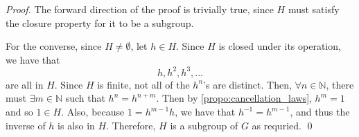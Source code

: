 \begin{proof}
  The forward direction of the proof is trivially true, since $H$ must satisfy the closure property for it to be a subgroup.

  For the converse, since $H \neq \emptyset$, let $h \in H$. Since $H$ is closed under its operation, we have that
  \begin{equation*}
    h, h^2, h^3, ...
  \end{equation*}
  are all in $H$. Since $H$ is finite, not all of the $h^n$'s are distinct. Then, $\forall n \in \mathbb{N}$, there must $\exists m \in \mathbb{N}$ such that $h^n = h^{n + m}$. Then by \autoref{propo:cancellation_laws}, $h^m = 1$ and so $1 \in H$. Also, because $1 = h^{m - 1} h$, we have that $h^{-1} = h^{m - 1}$, and thus the inverse of $h$ is also in $H$. Therefore, $H$ is a subgroup of $G$ as requried. \qed
\end{proof}



